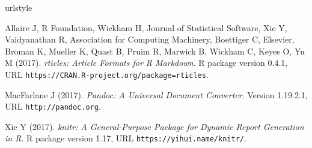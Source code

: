 \documentclass[letterpaper,9pt,twocolumn,twoside,]{pinp}
\begin{document}
\begin{thebibliography}{3}
\newcommand{\enquote}[1]{``#1''}
\providecommand{\natexlab}[1]{#1}
\providecommand{\url}[1]{\texttt{#1}}
\providecommand{\urlprefix}{URL }
\expandafter\ifx\csname urlstyle\endcsname\relax
  \providecommand{\doi}[1]{doi:\discretionary{}{}{}#1}\else
  \providecommand{\doi}{doi:\discretionary{}{}{}\begingroup
  \urlstyle{rm}\Url}\fi
\providecommand{\eprint}[2][]{\url{#2}}

Allaire J, {R Foundation}, Wickham H, {Journal of Statistical Software}, Xie Y,
  Vaidyanathan R, {Association for Computing Machinery}, Boettiger C,
  {Elsevier}, Broman K, Mueller K, Quast B, Pruim R, Marwick B, Wickham C,
  Keyes O, Yu M (2017).
\newblock \emph{rticles: Article Formats for R Markdown}.
\newblock R package version 0.4.1,
  \urlprefix\url{https://CRAN.R-project.org/package=rticles}.

MacFarlane J (2017).
\newblock \emph{Pandoc: A Universal Document Converter}.
\newblock Version 1.19.2.1, \urlprefix\url{http://pandoc.org}.

Xie Y (2017).
\newblock \emph{knitr: A General-Purpose Package for Dynamic Report Generation
  in R}.
\newblock R package version 1.17, \urlprefix\url{https://yihui.name/knitr/}.

\end{thebibliography}
\end{document}
